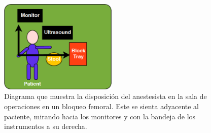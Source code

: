\begin{figure}[thbp]
   \centering
    \includegraphics[width=0.5\textwidth]{IMG/roomplacement.png}
    \caption{Diagrama que muestra la disposición del anestesista en la sala de operaciones en un bloqueo femoral. Este se sienta adyacente al paciente, mirando hacia los monitores y con la bandeja de los instrumentos a su derecha.}
   \label{fig:roomplace}
\end{figure}
















